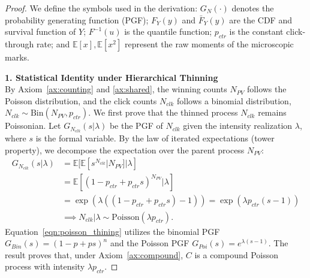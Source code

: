 \documentclass[sigconf, anonymous, review]{acmart}
\begin{document}
\begin{proof}
We define the symbols used in the derivation: $G_{N}(\cdot)$ denotes the probability generating function (PGF); $F_Y(y)$ and $\bar{F}_Y(y)$ are the CDF and survival function of $Y$; $F^{-1}(u)$ is the quantile function; $p_{ctr}$ is the constant click-through rate; and $\mathbb{E}[x], \mathbb{E}[x^2]$ represent the raw moments of the microscopic marks.

\textbf{1. Statistical Identity under Hierarchical Thinning}\\
By Axiom~\ref{ax:counting} and \ref{ax:shared}, the winning counts $N_{PV}$ follows the Poisson distribution, and the click counts $N_{clk}$ follows a binomial distribution, $N_{clk}\sim\textrm{Bin}(N_{PV},p_{ctr})$.
We first prove that the thinned process $N_{clk}$ remains Poissonian. Let $G_{N_{clk}}(s | \lambda)$ be the PGF of $N_{clk}$ given the intensity realization $\lambda$, where $s$ is the formal variable. By the law of iterated expectations (tower property), we decompose the expectation over the parent process $N_{PV}$:
\begin{equation}
\label{eqn:poisson_thining}
\begin{aligned}
    G_{N_{clk}}(s | \lambda) &= \mathbb{E}[ \mathbb{E}[ s^{N_{clk}} | N_{PV} ] | \lambda ] \\
    &= \mathbb{E}[ (1 - p_{ctr} + p_{ctr} s)^{N_{PV}} | \lambda ] \\
    &= \exp( \lambda ( (1 - p_{ctr} + p_{ctr} s) - 1 ) ) = \exp( \lambda p_{ctr} (s - 1) ) \\
    &\implies N_{clk} | \lambda \sim \text{Poisson}(\lambda p_{ctr}).
\end{aligned}
\end{equation}
Equation~\eqref{eqn:poisson_thining} utilizes the binomial PGF $G_{Bin}(s) = (1-p+ps)^n$ and the Poisson PGF $G_{Poi}(s) = e^{\lambda(s-1)}$. The result proves that, under Axiom~\ref{ax:compound}, $C$ is a compound Poisson process with intensity $\lambda p_{ctr}$.


\end{proof}
\end{document}
